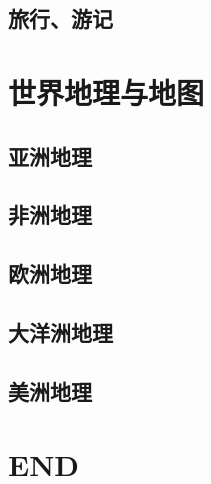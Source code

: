 \documentclass[UTF8]{../RepresentationUniverse}
\begin{document}
\section{旅行、游记}






\chapter{世界地理与地图}
\section{亚洲地理}
\section{非洲地理}
\section{欧洲地理}
\section{大洋洲地理}
\section{美洲地理}




\chapter{END}
\end{document}
